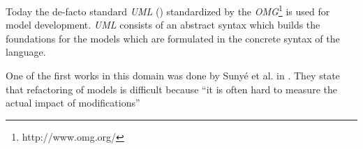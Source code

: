 \documentclass{llncs}
\begin{document}
Today the de-facto standard \textit{UML} (\cite{man:UML}) standardized by the \textit{OMG}\footnote{http://www.omg.org/} is used for model development. \textit{UML} consists of an abstract syntax which builds the foundations for the models which are formulated in the concrete syntax of the language. 

One of the first works in this domain was done by Suny{\'e} et al. in \cite{DBLP:conf/uml/SunyePTJ01}. They state that refactoring of models is difficult because ``it is often hard to measure the actual impact of modifications'' 

\newpage


\end{document}
